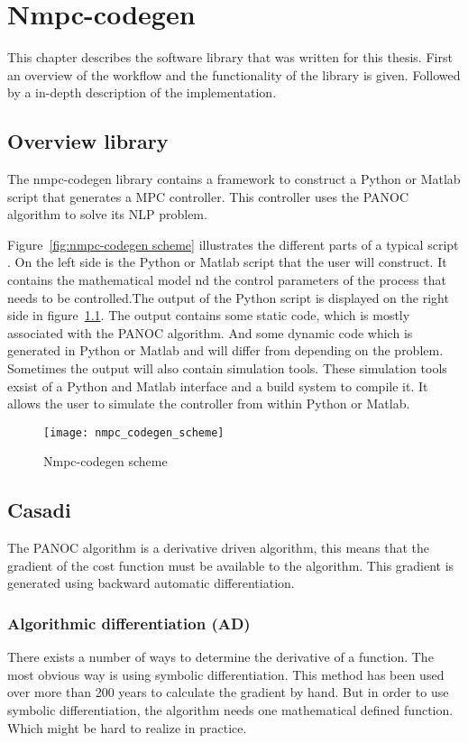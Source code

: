 \chapter{Nmpc-codegen}
This chapter describes the software library that was written for this thesis. First an overview of the workflow and the functionality of the library is given. Followed by a in-depth description of the implementation.
\section{Overview library}
The nmpc-codegen library contains a framework to construct a Python or Matlab script that generates a MPC controller. This controller uses the PANOC algorithm to solve its NLP problem.

Figure~\eqref{fig:nmpc-codegen scheme} illustrates the different parts of a typical script . On the left side is the Python or Matlab script that the user will construct. It contains the mathematical model nd the control parameters of the process that needs to be controlled.The output of the Python script is displayed on the right side in figure~\ref{fig:nmpc-codegen scheme}. The output contains some static code, which is mostly associated with the PANOC algorithm. And some dynamic code which is generated in Python or Matlab and will differ from depending on the problem. Sometimes the output will also contain simulation tools. These simulation tools exsist of a Python and Matlab interface and a build system to compile it. It allows the user to simulate the controller from within Python or Matlab.
	\begin{figure}[H]
		\centering
		\texttt{[image: nmpc\_codegen\_scheme]}
		\caption{Nmpc-codegen scheme}
		\label{fig:nmpc-codegen scheme}
	\end{figure}

\section{Casadi}
The PANOC algorithm is a derivative driven algorithm, this means that the gradient of the cost function must be available to the algorithm. This gradient is generated using backward automatic differentiation.

\subsection{Algorithmic differentiation (AD)}
There exists a number of ways to determine the derivative of a function. The most obvious way is using symbolic differentiation. This method has been used over more than 200 years to calculate the gradient by hand. But in order to use symbolic differentiation, the algorithm needs one mathematical defined function. Which might be hard to realize in practice.

